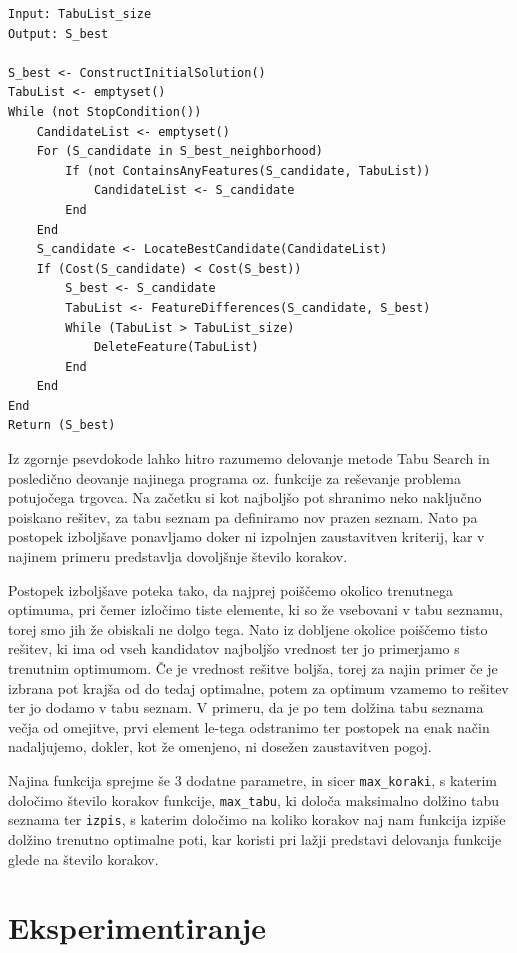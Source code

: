 \documentclass[10pt, a4paper]{article}
\begin{document}
\begin{verbatim}
Input: TabuList_size
Output: S_best

S_best <- ConstructInitialSolution()
TabuList <- emptyset()
While (not StopCondition())
    CandidateList <- emptyset()
    For (S_candidate in S_best_neighborhood)
        If (not ContainsAnyFeatures(S_candidate, TabuList))
            CandidateList <- S_candidate
        End
    End
    S_candidate <- LocateBestCandidate(CandidateList)
    If (Cost(S_candidate) < Cost(S_best))
        S_best <- S_candidate
        TabuList <- FeatureDifferences(S_candidate, S_best)
        While (TabuList > TabuList_size)
            DeleteFeature(TabuList)
        End
    End
End
Return (S_best)
\end{verbatim}

Iz zgornje psevdokode lahko hitro razumemo delovanje metode Tabu Search in posledično deovanje najinega programa oz. funkcije za reševanje problema potujočega trgovca. Na začetku si kot najboljšo pot shranimo neko naključno poiskano rešitev, za tabu seznam pa definiramo nov prazen seznam. Nato pa postopek izboljšave ponavljamo doker ni izpolnjen zaustavitven kriterij, kar v najinem primeru predstavlja dovoljšnje število korakov. 

Postopek izboljšave poteka tako, da najprej poiščemo okolico trenutnega optimuma, pri čemer izločimo tiste elemente, ki so že vsebovani v tabu seznamu, torej smo jih že obiskali ne dolgo tega. Nato iz dobljene okolice poiščemo tisto rešitev, ki ima od vseh kandidatov najboljšo vrednost ter jo primerjamo s trenutnim optimumom. Če je vrednost rešitve boljša, torej za najin primer če je izbrana pot krajša od do tedaj optimalne, potem za optimum vzamemo to rešitev ter jo dodamo v tabu seznam. V primeru, da je po tem dolžina tabu seznama večja od omejitve, prvi element le-tega odstranimo ter postopek na enak način nadaljujemo, dokler, kot že omenjeno, ni dosežen zaustavitven pogoj.

Najina funkcija sprejme še 3 dodatne parametre, in sicer \texttt{max\_koraki}, s katerim določimo število korakov funkcije, \texttt{max\_tabu}, ki določa maksimalno dolžino tabu seznama ter \texttt{izpis}, s katerim določimo na koliko korakov naj nam funkcija izpiše dolžino trenutno optimalne poti, kar koristi pri lažji predstavi delovanja funkcije glede na število korakov.





\section{Eksperimentiranje}
\end{document}
